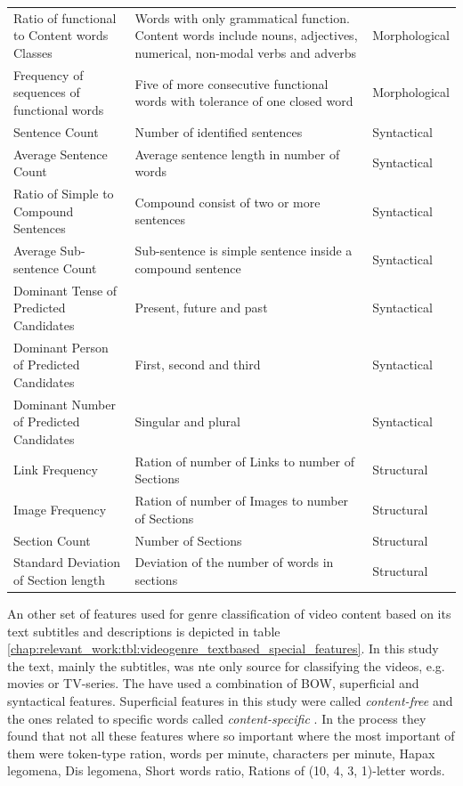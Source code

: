 \begin{table}[t]
\begin{tabular}{p{4cm}p{7cm}p{3cm}}
        Ratio of functional to Content words Classes & Words with only grammatical function. Content words include nouns, adjectives, numerical, non-modal verbs and adverbs  & Morphological \\
        Frequency of sequences of functional words & Five of more consecutive functional words with tolerance of one closed word & Morphological \\
		Sentence Count & Number of identified sentences & Syntactical \\
        Average Sentence Count & Average sentence length in number of words & Syntactical \\
        Ratio of Simple to Compound Sentences & Compound consist of two or more sentences & Syntactical \\
        Average Sub-sentence Count & Sub-sentence is simple sentence inside a compound sentence & Syntactical \\
        Dominant Tense of  Predicted Candidates & Present, future and past & Syntactical \\
        Dominant Person of  Predicted Candidates & First, second and third & Syntactical \\
        Dominant Number of  Predicted Candidates & Singular and plural & Syntactical \\
		Link Frequency & Ration of number of Links to number of Sections  & Structural \\
        Image Frequency & Ration of number of Images to number of Sections  & Structural \\
        Section Count & Number of Sections & Structural \\
        Standard Deviation of Section length & Deviation of the number of words in sections & Structural \\
		\hline
	\end{tabular}
\end{table}


An other set of features used for genre classification of video content based on its text subtitles and descriptions is depicted in table \ref{chap:relevant_work:tbl:videogenre_textbased_special_features}. In this study the text, mainly the subtitles, was nte only source for classifying the videos, e.g. movies or TV-series. The have used a combination of BOW, superficial and syntactical features. Superficial features in this study were called \textit{content-free} and the ones related to specific words called \textit{content-specific} \parencite{lee2017text}. In the process they found that not all these features where so important where the most important of them were token-type ration, words per minute, characters per minute, Hapax legomena, Dis legomena, Short words ratio, Rations of  (10, 4, 3, 1)-letter words. 

